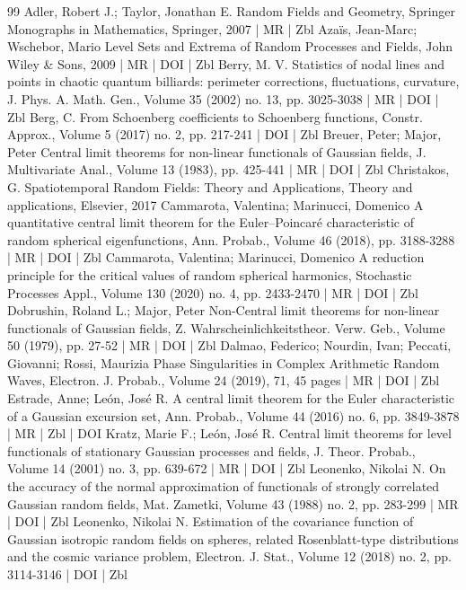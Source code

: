 \documentclass[10pt]{amsart}
\theoremstyle{definition}\newtheorem{defi}[theo]{Definition}\newtheorem{rema}[theo]{Remark}\newtheorem{exam}[theo]{Example}\newtheorem{exem}[theo]{Example}\newtheorem{nota}[theo]{Notation}
\begin{document}
\begin{thebibliography}{99}
 Adler, Robert J.; Taylor, Jonathan E. Random Fields and Geometry, Springer Monographs in Mathematics, Springer, 2007 | MR | Zbl
 Azaïs, Jean-Marc; Wschebor, Mario Level Sets and Extrema of Random Processes and Fields, John Wiley \& Sons, 2009 | MR | DOI | Zbl
 Berry, M. V. Statistics of nodal lines and points in chaotic quantum billiards: perimeter corrections, fluctuations, curvature, J. Phys. A. Math. Gen., Volume 35 (2002) no. 13, pp. 3025-3038 | MR | DOI | Zbl
 Berg, C. From Schoenberg coefficients to Schoenberg functions, Constr. Approx., Volume 5 (2017) no. 2, pp. 217-241 | DOI | Zbl
 Breuer, Peter; Major, Peter Central limit theorems for non-linear functionals of Gaussian fields, J. Multivariate Anal., Volume 13 (1983), pp. 425-441 | MR | DOI | Zbl
 Christakos, G. Spatiotemporal Random Fields: Theory and Applications, Theory and applications, Elsevier, 2017
 Cammarota, Valentina; Marinucci, Domenico A quantitative central limit theorem for the Euler–Poincaré characteristic of random spherical eigenfunctions, Ann. Probab., Volume 46 (2018), pp. 3188-3288 | MR | DOI | Zbl
 Cammarota, Valentina; Marinucci, Domenico A reduction principle for the critical values of random spherical harmonics, Stochastic Processes Appl., Volume 130 (2020) no. 4, pp. 2433-2470 | MR | DOI | Zbl
 Dobrushin, Roland L.; Major, Peter Non-Central limit theorems for non-linear functionals of Gaussian fields, Z. Wahrscheinlichkeitstheor. Verw. Geb., Volume 50 (1979), pp. 27-52 | MR | DOI | Zbl
 Dalmao, Federico; Nourdin, Ivan; Peccati, Giovanni; Rossi, Maurizia Phase Singularities in Complex Arithmetic Random Waves, Electron. J. Probab., Volume 24 (2019), 71, 45 pages | MR | DOI | Zbl
 Estrade, Anne; León, José R. A central limit theorem for the Euler characteristic of a Gaussian excursion set, Ann. Probab., Volume 44 (2016) no. 6, pp. 3849-3878 | MR | Zbl | DOI
 Kratz, Marie F.; León, José R. Central limit theorems for level functionals of stationary Gaussian processes and fields, J. Theor. Probab., Volume 14 (2001) no. 3, pp. 639-672 | MR | DOI | Zbl
 Leonenko, Nikolai N. On the accuracy of the normal approximation of functionals of strongly correlated Gaussian random fields, Mat. Zametki, Volume 43 (1988) no. 2, pp. 283-299 | MR | DOI | Zbl
 Leonenko, Nikolai N. Estimation of the covariance function of Gaussian isotropic random fields on spheres, related Rosenblatt-type distributions and the cosmic variance problem, Electron. J. Stat., Volume 12 (2018) no. 2, pp. 3114-3146 | DOI | Zbl

\end{thebibliography}
\end{document}
